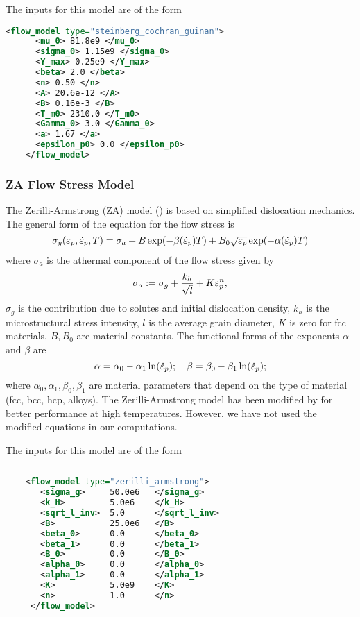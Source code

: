   The inputs for this model are of the form
  \begin{lstlisting}[language=XML]
    <flow_model type="steinberg_cochran_guinan">
      <mu_0> 81.8e9 </mu_0>
      <sigma_0> 1.15e9 </sigma_0>
      <Y_max> 0.25e9 </Y_max>
      <beta> 2.0 </beta>
      <n> 0.50 </n>
      <A> 20.6e-12 </A>
      <B> 0.16e-3 </B>
      <T_m0> 2310.0 </T_m0>
      <Gamma_0> 3.0 </Gamma_0>
      <a> 1.67 </a>
      <epsilon_p0> 0.0 </epsilon_p0>
    </flow_model>
  \end{lstlisting}

  \subsubsection{ZA Flow Stress Model}
  The Zerilli-Armstrong (ZA) model (\cite{Zerilli87,Zerilli93,Zerilli04})
  is based on simplified dislocation mechanics.  The general form of the
  equation for the flow stress is
  \begin{equation}
    \sigma_y(\varepsilon_p,\dot{\varepsilon}_{p},T) = 
      \sigma_a + B\exp(-\beta(\dot{\varepsilon}_{p}) T) + 
                           B_0\sqrt{\varepsilon_p}\exp(-\alpha(\dot{\varepsilon}_{p}) T)
  \end{equation}
  where $\sigma_a$ is the athermal component of the flow stress given by
  \begin{equation}
    \sigma_a := \sigma_g + \frac{k_h}{\sqrt{l}} + K\varepsilon_p^n,
  \end{equation}
  $\sigma_g$ is the contribution due to solutes and initial dislocation
  density, $k_h$ is the microstructural stress intensity, $l$ is the
  average grain diameter, $K$ is zero for fcc materials,
  $B, B_0$ are material constants.  The functional forms of the exponents
  $\alpha$ and $\beta$ are
  \begin{equation}
    \alpha = \alpha_0 - \alpha_1 \ln(\dot{\varepsilon}_{p}); \quad
    \beta = \beta_0 - \beta_1 \ln(\dot{\varepsilon}_{p}); 
  \end{equation}
  where $\alpha_0, \alpha_1, \beta_0, \beta_1$ are material parameters that
  depend on the type of material (fcc, bcc, hcp, alloys).  The Zerilli-Armstrong
  model has been modified by \cite{Abed05} for better performance at high
  temperatures.  However, we have not used the modified equations in our
  computations.

  The inputs for this model are of the form
  \begin{lstlisting}[language=XML]
    
    <flow_model type="zerilli_armstrong">
       <sigma_g>     50.0e6   </sigma_g>
       <k_H>         5.0e6    </k_H>
       <sqrt_l_inv>  5.0      </sqrt_l_inv>
       <B>           25.0e6   </B>
       <beta_0>      0.0      </beta_0>
       <beta_1>      0.0      </beta_1>
       <B_0>         0.0      </B_0>
       <alpha_0>     0.0      </alpha_0>
       <alpha_1>     0.0      </alpha_1>
       <K>           5.0e9    </K>
       <n>           1.0      </n>
     </flow_model>
  \end{lstlisting}

